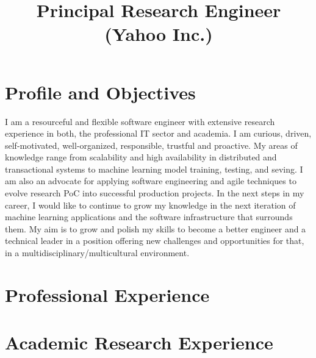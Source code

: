 \documentclass[10pt,letter]{moderncv}
\title{Principal Research Engineer (Yahoo Inc.)}
\begin{document}
\maketitle
\vspace{-1cm}

\section{Profile and Objectives}
\small I am a resourceful and flexible software engineer with extensive research experience in both, the professional IT sector and academia. I am curious, driven, self-motivated, well-organized, responsible, trustful and proactive.
My areas of knowledge range from scalability and high availability in distributed and transactional systems to machine learning model training, testing, and seving. I am also an advocate for applying software engineering and agile techniques to evolve research PoC into successful production projects. In the next steps in my career, I would like to continue to grow my knowledge in the next iteration of machine learning applications and the software infrastructure that surrounds them. My aim is to grow and polish my skills to become a better engineer and a technical leader in a position offering new challenges and opportunities for that, in a multidisciplinary/multicultural environment.

\section{Professional Experience}

\section{Academic Research Experience}
\vspace{-0.6cm}
\end{document}
